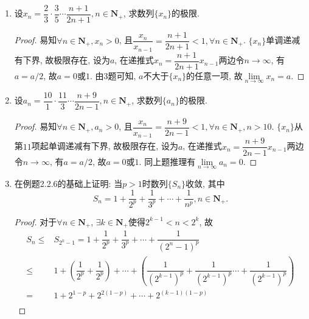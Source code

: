 \documentclass[a4paper,11pt,twoside]{ctexbook}
\begin{document}
\begin{enumerate}
\begin{proof}
		      设$\{y_n\}$是单调减少有下界的数列, 则$\{-y_n\}$是单调增加有上界的数列, 由单调有界原理, 若$\lim\limits_{n\to\infty} y_n=b$, 则$\lim\limits_{n\to\infty} -y_n=-b$. 由前可知, $\forall n\in\mathbf{N}_{+}, -y_n\leqslant-b$, 即$\forall n\in\mathbf{N}_{+}, y_n\geqslant b$.\qedhere
	      \end{proof}
	\item 设$x_n=\dfrac{2}{3}\cdot\dfrac{3}{5}\cdots\dfrac{n+1}{2n+1}, n\in\mathbf{N}_{+}$, 求数列$\{x_n\}$的极限.
	      \begin{proof}
		      易知$\forall n\in\mathbf{N}_{+}, x_n>0$, 且$\dfrac{x_n}{x_{n-1}}=\dfrac{n+1}{2n+1}<1, \forall n\in\mathbf{N}_{+}$. $\{x_n\}$单调递减有下界, 故极限存在, 设为$a$, 在递推式$x_n=\dfrac{n+1}{2n+1}x_{n-1}$两边令$n\to\infty$, 有$a=a/2$, 故$a=0$或$1$. 由3题可知, $a$不大于$\{x_n\}$的任意一项, 故$\lim\limits_{n\to\infty} x_n=a$.\qedhere
	      \end{proof}
	\item 设$a_n=\dfrac{10}{1}\cdot\dfrac{11}{3}\cdots\dfrac{n+9}{2n-1}, n\in\mathbf{N}_{+}$, 求数列$\{a_n\}$的极限.
	      \begin{proof}
		      易知$\forall n\in\mathbf{N}_{+}, a_n>0$, 且$\dfrac{x_n}{x_{n-1}}=\dfrac{n+9}{2n-1}<1, \forall n\in\mathbf{N}_{+}, n>10$. $\{x_n\}$从第$11$项起单调递减有下界, 故极限存在, 设为$a$, 在递推式$x_n=\dfrac{n+9}{2n-1}x_{n-1}$两边令$n\to\infty$, 有$a=a/2$, 故$a=0$或$1$. 同上题推理有$\lim\limits_{n\to\infty} a_n=0$.\qedhere
	      \end{proof}
	\item 在例题2.2.6的基础上证明: 当$p>1$时数列$\{S_n\}$收敛, 其中
	      \[
		      S_n=1+\dfrac{1}{2^p}+\dfrac{1}{3^p}+\cdots+\dfrac{1}{n^p}, n\in\mathbf{N}_{+}.
	      \]
	      \begin{proof}
		      对于$\forall n\in\mathbf{N}_{+}$, $\exists k\in\mathbf{N}_{+}$使得$2^{k-1}<n<2^{k}$, 故
		      \begin{equation*}
			      \begin{split}
				      S_n\leqslant & S_{2^k-1}=1+\dfrac{1}{2^p}+\dfrac{1}{3^p}+\cdots+\dfrac{1}{(2^n-1)^p}                                                                                         \\
				      \leqslant        & 1+\left(\dfrac{1}{2^p}+\dfrac{1}{2^p}\right)+\cdots+\left(\dfrac{1}{(2^{k-1})^p}+\dfrac{1}{(2^{k-1})^p}\cdots+\dfrac{1}{(2^{k-1})^p}\right) \\
				      =                & 1+2^{1-p}+2^{2(1-p)}+\cdots+2^{(k-1)(1-p)}                                                                                                    \\

\end{split}
\end{equation*}
\end{proof}
\end{enumerate}
\end{document}
